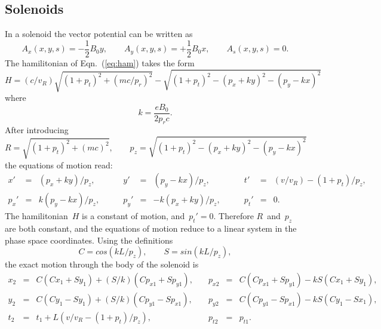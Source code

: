 \documentclass{report}
\begin{document}
\clearpage
\subsection{Solenoids}
In a solenoid the vector potential can be written as
\begin{equation}
  A_x(x,y,s) =-\frac{1}{2} B_0 y, \qquad
  A_y(x,y,s) =+\frac{1}{2} B_0 x, \qquad
  A_s(x,y,s) = 0.
\end{equation}
The hamilitonian of Eqn.~(\ref{eq:ham}) takes the form
\begin{equation}
  H = (c/v_R) \sqrt{(1+p_t)^2+(mc/p_r)^2} -
  \sqrt{(1+p_t)^2-(p_x+k y)^2-(p_y-k x)^2}
\end{equation}
where
\begin{equation}
  k = \frac{e B_0}{2 p_r c}.
\end{equation}
After introducing
\begin{equation}
  R = \sqrt{(1+p_t)^2+(mc)^2}, \qquad 
  p_z = \sqrt{(1+p_{t})^2-(p_{x}+ky)^2-(p_{y}-kx)^2}
\end{equation}
the equations of motion read:
\begin{equation}
  \begin{array}{lcllcllcl}
    x'&=&(p_x+k y) / p_z, \qquad &
    y'&=&(p_y-k x) / p_z, \qquad &
    t'&=&(v/v_R)-(1+p_t)/p_z, \\
    p_x'&=&  k (p_y-k x) / p_z, \qquad &
    p_y'&=&- k (p_x+k y) / p_z, \qquad &
    p_t'&=&0.
  \end{array}
\end{equation}
The hamilitonian~$H$ is a constant of motion, and~$p_t' = 0$.
Therefore $R$~and~$p_z$ are both constant,
and the equations of motion reduce to a linear system in the phase
space coordinates.
Using the definitions
\begin{equation}
  C = cos(kL/p_z), \qquad
  S = sin(kL/p_z),
\end{equation}
the exact motion through the body of the solenoid is
\begin{equation}
  \begin{array}{lcllcl}
    x_2   &=& C (C x_1 + S y_1) + (S/k) (C p_{x1} + S p_{y1}), \quad &
    p_{x2}&=& C (C p_{x1} + S p_{y1}) - k S (C x_1 + S y_1), \\
    y_2   &=& C (C y_1 - S y_1) + (S/k) (C p_{y1} - S p_{x1}), \quad &
    p_{y2}&=& C (C p_{y1} - S p_{x1}) - k S (C y_1 - S x_1), \\
    t_2   &=&t_1 + L\left(v/v_R - (1 + p_t) / p_z\right), \quad &
    p_{t2}&=&p_{t1}.
  \end{array}
  \label{eq:solo}
\end{equation}
\end{document}
